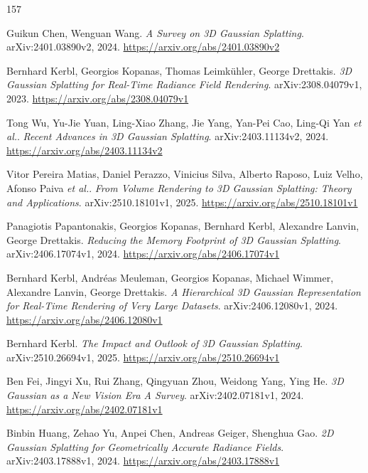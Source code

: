 \documentclass[11pt,a4paper]{article}
\begin{document}
\begin{thebibliography}{157}
\setlength{\itemsep}{2pt}

Guikun Chen, Wenguan Wang.
\newblock \emph{A Survey on 3D Gaussian Splatting}.
\newblock arXiv:2401.03890v2, 2024.
\newblock \url{https://arxiv.org/abs/2401.03890v2}

Bernhard Kerbl, Georgios Kopanas, Thomas Leimk\"{u}hler, George Drettakis.
\newblock \emph{3D Gaussian Splatting for Real-Time Radiance Field Rendering}.
\newblock arXiv:2308.04079v1, 2023.
\newblock \url{https://arxiv.org/abs/2308.04079v1}

Tong Wu, Yu-Jie Yuan, Ling-Xiao Zhang, Jie Yang, Yan-Pei Cao, Ling-Qi Yan \emph{et al.}.
\newblock \emph{Recent Advances in 3D Gaussian Splatting}.
\newblock arXiv:2403.11134v2, 2024.
\newblock \url{https://arxiv.org/abs/2403.11134v2}

Vitor Pereira Matias, Daniel Perazzo, Vinicius Silva, Alberto Raposo, Luiz Velho, Afonso Paiva \emph{et al.}.
\newblock \emph{From Volume Rendering to 3D Gaussian Splatting: Theory and Applications}.
\newblock arXiv:2510.18101v1, 2025.
\newblock \url{https://arxiv.org/abs/2510.18101v1}

Panagiotis Papantonakis, Georgios Kopanas, Bernhard Kerbl, Alexandre Lanvin, George Drettakis.
\newblock \emph{Reducing the Memory Footprint of 3D Gaussian Splatting}.
\newblock arXiv:2406.17074v1, 2024.
\newblock \url{https://arxiv.org/abs/2406.17074v1}

Bernhard Kerbl, Andr\'{e}as Meuleman, Georgios Kopanas, Michael Wimmer, Alexandre Lanvin, George Drettakis.
\newblock \emph{A Hierarchical 3D Gaussian Representation for Real-Time Rendering of Very Large Datasets}.
\newblock arXiv:2406.12080v1, 2024.
\newblock \url{https://arxiv.org/abs/2406.12080v1}

Bernhard Kerbl.
\newblock \emph{The Impact and Outlook of 3D Gaussian Splatting}.
\newblock arXiv:2510.26694v1, 2025.
\newblock \url{https://arxiv.org/abs/2510.26694v1}

Ben Fei, Jingyi Xu, Rui Zhang, Qingyuan Zhou, Weidong Yang, Ying He.
\newblock \emph{3D Gaussian as a New Vision Era A Survey}.
\newblock arXiv:2402.07181v1, 2024.
\newblock \url{https://arxiv.org/abs/2402.07181v1}

Binbin Huang, Zehao Yu, Anpei Chen, Andreas Geiger, Shenghua Gao.
\newblock \emph{2D Gaussian Splatting for Geometrically Accurate Radiance Fields}.
\newblock arXiv:2403.17888v1, 2024.
\newblock \url{https://arxiv.org/abs/2403.17888v1}


\end{thebibliography}
\end{document}
